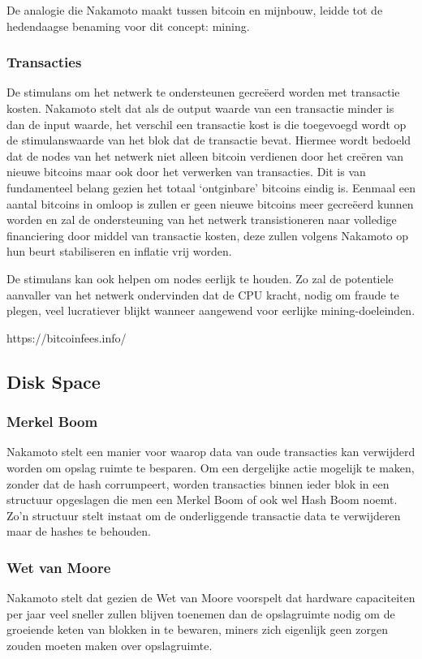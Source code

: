 		De analogie die Nakamoto maakt tussen bitcoin en mijnbouw, leidde tot de hedendaagse benaming voor dit concept: mining. 
		
		\subsubsection{Transacties}
		De stimulans om het netwerk te ondersteunen gecreëerd worden met transactie kosten. Nakamoto stelt dat als de output waarde van een transactie minder is dan de input waarde, het verschil een transactie kost is die toegevoegd wordt op de stimulanswaarde van het blok dat de transactie bevat. Hiermee wordt bedoeld dat de nodes van het netwerk niet alleen bitcoin verdienen door het creëren van nieuwe bitcoins maar ook door het verwerken van transacties. Dit is van fundamenteel belang gezien het totaal ‘ontginbare’ bitcoins eindig is. Eenmaal een aantal bitcoins in omloop is zullen er geen nieuwe bitcoins meer gecreëerd kunnen worden en zal de ondersteuning van het netwerk transistioneren naar volledige financiering door middel van transactie kosten, deze zullen volgens Nakamoto op hun beurt stabiliseren en inflatie vrij worden.
		
		De stimulans kan ook helpen om nodes eerlijk te houden. Zo zal de potentiele aanvaller van het netwerk ondervinden dat de CPU kracht, nodig om fraude te plegen, veel lucratiever blijkt wanneer aangewend voor eerlijke mining-doeleinden. 
		
		https://bitcoinfees.info/
		
	\subsection{Disk Space}
	\subsubsection{Merkel Boom}
	Nakamoto stelt  een manier voor waarop data van oude transacties kan verwijderd worden om opslag ruimte te besparen. Om een dergelijke actie mogelijk te maken, zonder dat de hash corrumpeert, worden transacties binnen ieder blok in een structuur opgeslagen die men een Merkel Boom of ook wel Hash Boom noemt. Zo’n structuur stelt instaat om de onderliggende transactie data te verwijderen maar de hashes te behouden. 
	\subsubsection{Wet van Moore}	
	Nakamoto stelt  dat gezien de Wet van Moore voorspelt dat hardware capaciteiten per jaar veel sneller zullen blijven toenemen dan de opslagruimte nodig om de groeiende keten van blokken in te bewaren, miners zich eigenlijk geen zorgen zouden moeten maken over opslagruimte.
